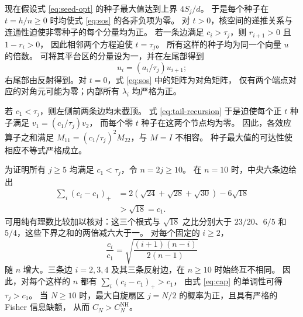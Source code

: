 \documentclass[aps,pra,reprint,superscriptaddress,longbibliography]{revtex4-2}
\theoremstyle{remark}
\newcommand{\nh}{\mathrm{NH}}
\begin{document}
现在假设式 \eqref{eq:seed-opt} 的种子最大值达到上界 $4S_j/d$。
于是每个种子在 $t=h/n\geq0$ 时均使式 \eqref{eq:sos} 的各非负项为零。
对 $t>0$，核空间的递推关系与连通性迫使非零种子的每个分量均为正。
若一条边满足 $c_i>\tau_j$，则 $r_{i+1}>0$ 且 $1-r_i>0$，
因此相邻两个方程迫使 $t=\tau_j$。
所有这样的种子均为同一个向量 $u$ 的倍数。
可将其平台区的分量设为一，并在左尾部得到
\begin{equation}
 u_i=(a_i/\tau_j)u_{i+1};
 \label{eq:tail-recursion}
\end{equation}
右尾部由反射得到。对 $t=0$，式 \eqref{eq:sos} 中的矩阵为对角矩阵，
仅有两个端点对应的对角元可能为零；内部所有 $\lambda_i$ 均严格为正。

若 $c_1<\tau_j$，则左侧前两条边均未截顶。
式 \eqref{eq:tail-recursion} 于是迫使每个正 $t$ 种子满足 $v_1=(c_1/\tau_j)v_2$，
而每个零 $t$ 种子在这两个节点均为零。
因此，各效应算子之和满足 $M_{11}=(c_1/\tau_j)^2M_{22}$，与 $M=I$ 不相容。
种子最大值的可达性使相应不等式严格成立。

为证明所有 $j\geq5$ 均满足 $c_1<\tau_j$，令 $n=2j\geq10$。
在 $n=10$ 时，中央六条边给出
\begin{align*}
 \sum_i(c_i-c_1)_+
 &=2(\sqrt{24}+\sqrt{28}+\sqrt{30})-6\sqrt{18}\\
 &>\sqrt{18}=c_1.
\end{align*}
可用纯有理数比较加以核对：这三个根式与 $\sqrt{18}$ 之比分别大于
$23/20$、$6/5$ 和 $5/4$，这些下界之和的两倍减六大于一。
对每个固定的 $i\geq2$，
\[
 \frac{c_i}{c_1}=
 \sqrt{\frac{(i+1)(n-i)}{2(n-1)}}
\]
随 $n$ 增大。三条边 $i=2,3,4$ 及其三条反射边，在 $n\geq10$ 时始终互不相同。
因此，对每个这样的 $n$ 都有 $\sum_i(c_i-c_1)_+>c_1$，
由式 \eqref{eq:cap} 的单调性可得 $\tau_j>c_1$。
当 $N\geq10$ 时，最大自旋扇区 $j=N/2$ 的概率为正，且具有严格的 Fisher 信息缺额，
从而 $C_N>C_N^{\nh}$。


\end{document}
